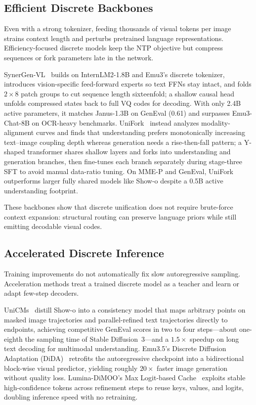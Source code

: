 \subsection{Efficient Discrete Backbones}
\label{subsec:efficient-backbone}

Even with a strong tokenizer, feeding thousands of visual tokens per image strains context length and perturbs pretrained language representations. Efficiency-focused discrete models keep the NTP objective but compress sequences or fork parameters late in the network.

SynerGen-VL~\cite{li2025synergen} builds on InternLM2-1.8B and Emu3's discrete tokenizer, introduces vision-specific feed-forward experts so text FFNs stay intact, and folds $2\times8$ patch groups to cut sequence length sixteenfold; a shallow causal head unfolds compressed states back to full VQ codes for decoding. With only 2.4B active parameters, it matches Janus-1.3B on GenEval (0.61) and surpasses Emu3-Chat-8B on OCR-heavy benchmarks. UniFork~\cite{li2025unifork} instead analyzes modality-alignment curves and finds that understanding prefers monotonically increasing text--image coupling depth whereas generation needs a rise-then-fall pattern; a Y-shaped transformer shares shallow layers and forks into understanding and generation branches, then fine-tunes each branch separately during stage-three SFT to avoid manual data-ratio tuning. On MME-P and GenEval, UniFork outperforms larger fully shared models like Show-o despite a 0.5B active understanding footprint.

These backbones show that discrete unification does not require brute-force context expansion: structural routing can preserve language priors while still emitting decodable visual codes.

\subsection{Accelerated Discrete Inference}
\label{subsec:accel-inference}

Training improvements do not automatically fix slow autoregressive sampling. Acceleration methods treat a trained discrete model as a teacher and learn or adapt few-step decoders.

UniCMs~\cite{xu2025unicms} distill Show-o into a consistency model that maps arbitrary points on masked image trajectories and parallel-refined text trajectories directly to endpoints, achieving competitive GenEval scores in two to four steps---about one-eighth the sampling time of Stable Diffusion~3---and a $1.5\times$ speedup on long text decoding for multimodal understanding. Emu3.5's Discrete Diffusion Adaptation (DiDA)~\cite{cui2025emu3} retrofits the autoregressive checkpoint into a bidirectional block-wise visual predictor, yielding roughly $20\times$ faster image generation without quality loss. Lumina-DiMOO's Max Logit-based Cache~\cite{xin2025lumina} exploits stable high-confidence tokens across refinement steps to reuse keys, values, and logits, doubling inference speed with no retraining.

